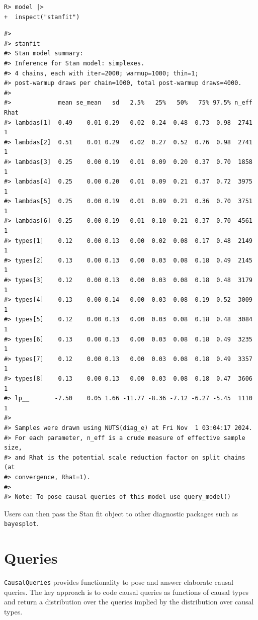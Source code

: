 \documentclass[
  11pt,
  article]{jss}
\begin{document}
\begin{verbatim}
R> model |> 
+  inspect("stanfit")
\end{verbatim}

\begin{verbatim}
#> 
#> stanfit
#> Stan model summary:
#> Inference for Stan model: simplexes.
#> 4 chains, each with iter=2000; warmup=1000; thin=1; 
#> post-warmup draws per chain=1000, total post-warmup draws=4000.
#> 
#>             mean se_mean   sd   2.5%   25%   50%   75% 97.5% n_eff Rhat
#> lambdas[1]  0.49    0.01 0.29   0.02  0.24  0.48  0.73  0.98  2741    1
#> lambdas[2]  0.51    0.01 0.29   0.02  0.27  0.52  0.76  0.98  2741    1
#> lambdas[3]  0.25    0.00 0.19   0.01  0.09  0.20  0.37  0.70  1858    1
#> lambdas[4]  0.25    0.00 0.20   0.01  0.09  0.21  0.37  0.72  3975    1
#> lambdas[5]  0.25    0.00 0.19   0.01  0.09  0.21  0.36  0.70  3751    1
#> lambdas[6]  0.25    0.00 0.19   0.01  0.10  0.21  0.37  0.70  4561    1
#> types[1]    0.12    0.00 0.13   0.00  0.02  0.08  0.17  0.48  2149    1
#> types[2]    0.13    0.00 0.13   0.00  0.03  0.08  0.18  0.49  2145    1
#> types[3]    0.12    0.00 0.13   0.00  0.03  0.08  0.18  0.48  3179    1
#> types[4]    0.13    0.00 0.14   0.00  0.03  0.08  0.19  0.52  3009    1
#> types[5]    0.12    0.00 0.13   0.00  0.03  0.08  0.18  0.48  3084    1
#> types[6]    0.13    0.00 0.13   0.00  0.03  0.08  0.18  0.49  3235    1
#> types[7]    0.12    0.00 0.13   0.00  0.03  0.08  0.18  0.49  3357    1
#> types[8]    0.13    0.00 0.13   0.00  0.03  0.08  0.18  0.47  3606    1
#> lp__       -7.50    0.05 1.66 -11.77 -8.36 -7.12 -6.27 -5.45  1110    1
#> 
#> Samples were drawn using NUTS(diag_e) at Fri Nov  1 03:04:17 2024.
#> For each parameter, n_eff is a crude measure of effective sample size,
#> and Rhat is the potential scale reduction factor on split chains (at 
#> convergence, Rhat=1).
#> 
#> Note: To pose causal queries of this model use query_model()
\end{verbatim}

Users can then pass the Stan fit object to other diagnostic packages
such as \texttt{bayesplot}.

\section{Queries}\label{sec-query}

\texttt{CausalQueries} provides functionality to pose and answer
elaborate causal queries. The key approach is to code causal queries as
functions of causal types and return a distribution over the queries
implied by the distribution over causal types.
\end{document}
